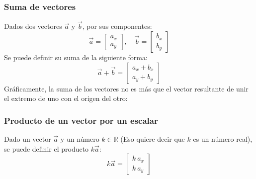 \documentclass[ %
    oneside,    %
    10pt        %
]{apuntes} %
\begin{document}
\subsubsection{Suma de vectores}
Dados dos vectores $\vec{a}$ y $\vec{b}$, por sus componentes:
\[\vec{a} = \left[\begin{array}{c} a_x \\ a_y \end{array}\right],\quad \vec{b} = \left[\begin{array}{c} b_x \\ b_y \end{array}\right]\]
Se puede definir su suma de la siguiente forma:
\[\vec{a} + \vec{b} = \left[\begin{array}{c} a_x + b_x \\ a_y + b_y \end{array}\right]\]
Gráficamente, la suma de los vectores no es más que el vector resultante de unir el extremo de uno con el origen del otro:
\begin{figure}[ht]
	\centering
\end{figure}

\subsubsection{Producto de un vector por un escalar}
Dado un vector $\vec{a}$ y un número $k \in \mathbb{R}$ (Eso quiere decir que $k$ es un número real), se puede definir el producto $k \vec{a}$:
\[k \vec{a} = \left[\begin{array}{c} k\ a_x\\ k\ a_y\end{array}\right]\]
\end{document}
